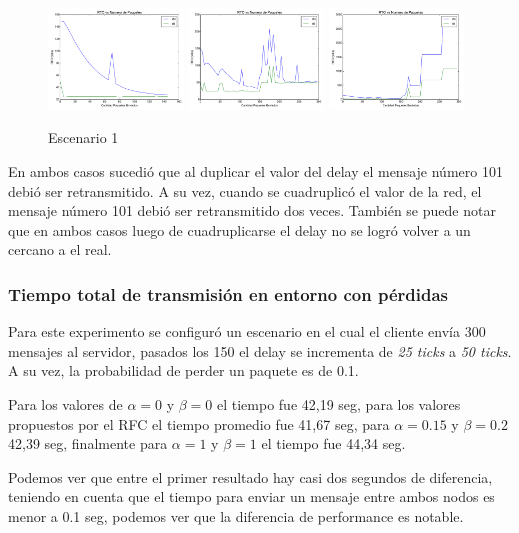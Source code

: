         \begin{figure}[H]
            \center
	        
		    \includegraphics[width=0.32\textwidth]{imagenes/rtt_vs_n_8_2.pdf}
		    \includegraphics[width=0.32\textwidth]{imagenes/congestion_50_8_2.pdf}
		    \includegraphics[width=0.32\textwidth]{imagenes/congestion_100_8_2.pdf}

            \caption{Escenario 1}
	
        \end{figure}          

        En ambos casos sucedi\'o que al duplicar el valor del delay el 
        mensaje n\'umero 101 debi\'o ser retransmitido. A su vez, cuando 
        se cuadruplic\'o el valor de la red, el mensaje n\'umero 101 debi\'o
        ser retransmitido dos veces. 
        Tambi\'en se puede notar que en ambos casos luego de cuadruplicarse
        el delay no se logr\'o volver a un \rto{} cercano a el \rtt{} real.


    \subsubsection{Tiempo total de transmisi\'on en entorno con p\'erdidas}
        
        Para este experimento se configur\'o un escenario en el cual el 
        cliente env\'ia 300 mensajes al servidor, pasados los 150 el delay
        se incrementa de \textit{25 ticks} a \textit{50 ticks}. A su vez,
        la probabilidad de perder un paquete es de 0.1.
        
        Para los valores de $\alpha=0$ y $\beta=0$ el tiempo fue 42,19 seg,
        para los valores propuestos por el RFC el tiempo promedio fue
        41,67 seg, para $\alpha=0.15$ y $\beta=0.2$ 42,39 seg, finalmente  
        para $\alpha=1$ y $\beta=1$ el tiempo fue 44,34 seg.
        
        Podemos ver que entre el primer resultado hay casi dos segundos 
        de diferencia, teniendo en cuenta que el tiempo para enviar un 
        mensaje entre ambos nodos es menor a 0.1 seg, podemos ver que la 
        diferencia de performance es notable.
